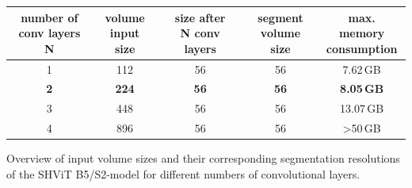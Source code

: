 \begin{center}
	\begin{threeparttable}[H]
		\begin{tabular}{c|c|c|c|c}
			\toprule
			\CellWithForcedBreak{number of \\ conv layers N} & \CellWithForcedBreak{volume \\ input size} & \CellWithForcedBreak{size after \\ N conv layers} & \CellWithForcedBreak{segment \\ volume size} & \CellWithForcedBreak{max. memory \\ consumption} \\
			\midrule
			\midrule
			1 & 112 & 56 & 56 & 7.62\,GB \\
			{\bf 2} & {\bf 224} & {\bf 56} & {\bf 56} & {\bf 8.05\,GB} \\
			3 & 448 & 56 & 56 & 13.07\,GB \\
			\midrule
			4 & 896 & 56 & 56 & >50\,GB \\
			\bottomrule
		\end{tabular}
		\caption[Overview of input volume sizes and their corresponding segmentation resolutions of the SHViT B5/S2-model for different numbers of conv.~layers]{Overview of input volume sizes and their corresponding segmentation resolutions of the SHViT B5/S2-model for different numbers of convolutional layers.}
		\label{tab:volume_layers}
	\end{threeparttable}
\end{center}


